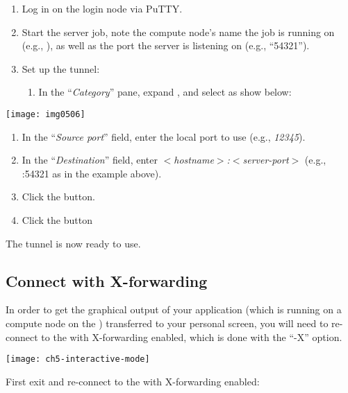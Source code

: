   \begin{enumerate}
    \item  Log in on the login node via PuTTY.
    \item  Start the server job, note the compute node's name the job is running
    on (e.g., \computenode), as well as the port the server is listening on
  (e.g., ``54321'').  \item  Set up the tunnel:

    \begin{enumerate}
      \item  In the ``\emph{Category}'' pane, expand , and select  as show below:
    \end{enumerate}
  \end{enumerate}

  \texttt{[image: img0506]}

  \begin{enumerate}
    \item  In the ``\emph{Source port}'' field, enter the local port to use (e.g., \emph{12345}).
    \item  In the ``\emph{Destination}'' field, enter \emph{$<$hostname$>$:$<$server-port$>$} (e.g., \computenode:54321 as in the example above).
    \item  Click the  button.
    \item  Click the  button
  \end{enumerate}

  The tunnel is now ready to use.
\fi %

\ifmacORlinux
\subsection{Connect with X-forwarding}

In order to get the graphical output of your application (which is running on a
compute node on the \hpc) transferred to your personal screen, you will need
to re-connect to the \hpc with X-forwarding enabled, which is done with the
``-X'' option.

\texttt{[image: ch5-interactive-mode]}

First exit and re-connect to the \hpc with X-forwarding enabled:

\begin{prompt}
\end{prompt}

